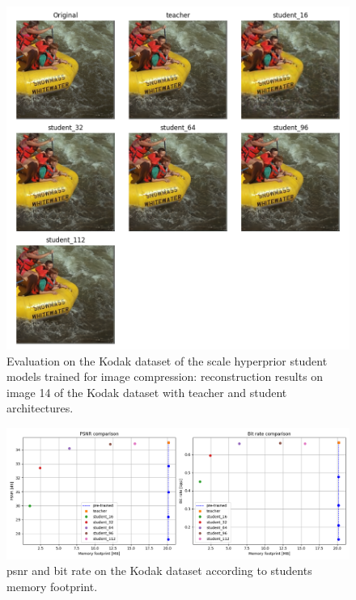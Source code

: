 \begin{figure}
    \centering
    \includegraphics[width=15cm]{img/kd_ae_kodak_14.png}
    \caption[Evaluation on the Kodak dataset of the scale hyperprior student models trained for image compression: reconstruction results on image 14 of the Kodak dataset with teacher and student architectures.]{Evaluation on the Kodak dataset of the scale hyperprior student models trained for image compression: reconstruction results on image 14 of the Kodak dataset with teacher and student architectures.}
    \label{appendix:kd_ae_1}
\end{figure}

\begin{figure}
    \centering
    \includegraphics[width=15cm]{img/kd_lic_memory.png}
    \caption[\acrshort{psnr} and bit rate on the Kodak dataset according to students memory footprint.]{\acrshort{psnr} and bit rate on the Kodak dataset according to students memory footprint.}
    \label{appendix:kd_lic_memory}
\end{figure}


